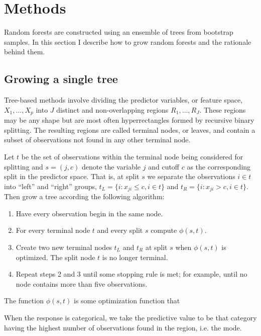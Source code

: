 \section{Methods}

Random forests are constructed using an ensemble of trees from bootstrap samples. In this section I describe how to grow random forests and the rationale behind them.

\subsection{Growing a single tree}

Tree-based methods involve dividing the predictor variables, or feature space, $X_1,\ldots,X_p$ into $J$ distinct and non-overlapping regions $R_1,\ldots,R_J$. These regions may be any shape but are most often hyperrectangles formed by recursive binary splitting. The resulting regions are called terminal nodes, or leaves, and contain a subset of observations not found in any other terminal node.

Let $t$ be the set of observations within the terminal node being considered for splitting and $s=(j, c)$ denote the variable $j$ and cutoff $c$ as the corresponding split in the predictor space. That is, at split $s$ we separate the observations $i\in t$ into ``left'' and ``right'' groups, $t_L=\{i:x_{ji}\leq c, i\in t\}$ and $t_R=\{i:x_{ji} > c, i\in t\}$. Then grow a tree according the following algorithm:

\begin{enumerate}
\item Have every observation begin in the same node.
\item For every terminal node $t$ and every split $s$ compute $\phi(s, t)$.
\item Create two new terminal nodes $t_L$ and $t_R$ at split $s$ when $\phi(s, t)$ is optimized. The split node $t$ is no longer terminal.
\item Repeat steps 2 and 3 until some stopping rule is met; for example, until no node contains more than five observations.
\end{enumerate}

The function $\phi(s, t)$ is some optimization function that 






When the response is categorical, we take the predictive value to be that category having the highest number of observations found in the region, i.e. the mode.

